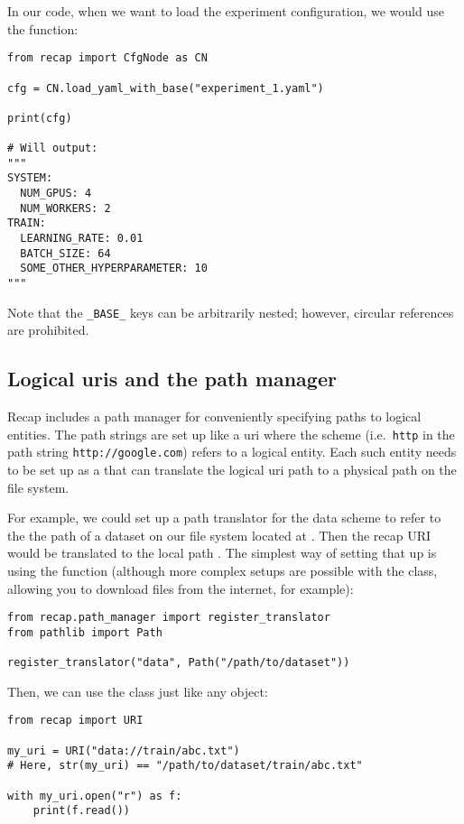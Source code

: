 \documentclass[../../report.tex]{subfiles}
\begin{document}
In our code, when we want to load the experiment configuration, we would use the  function:

\begin{verbatim}
from recap import CfgNode as CN

cfg = CN.load_yaml_with_base("experiment_1.yaml")

print(cfg)

# Will output:
"""
SYSTEM:
  NUM_GPUS: 4
  NUM_WORKERS: 2
TRAIN:
  LEARNING_RATE: 0.01
  BATCH_SIZE: 64
  SOME_OTHER_HYPERPARAMETER: 10
"""
\end{verbatim}
Note that the \texttt{_BASE_} keys can be arbitrarily nested;
however, circular references are prohibited.

\subsection{Logical \acsp{uri} and the path manager}
\label{sec:recap_uris}
Recap includes a path manager for conveniently specifying paths to logical entities.
The path strings are set up like a \gls{uri} where the scheme (i.e.\ \texttt{http} in the path string \texttt{http://google.com}) refers to a logical entity.
Each such entity needs to be set up as a  that can translate the logical \gls{uri} path to a physical path on the file system.

For example, we could set up a path translator for the data scheme to refer to the the path of a dataset on our file system located at . Then the recap URI  would be translated to the local path .
The simplest way of setting that up is using the  function (although more complex setups are possible with the  class, allowing you to download files from the internet, for example):

\begin{verbatim}
from recap.path_manager import register_translator
from pathlib import Path

register_translator("data", Path("/path/to/dataset"))
\end{verbatim}
Then, we can use the  class just like any  object:
\begin{verbatim}
from recap import URI

my_uri = URI("data://train/abc.txt")
# Here, str(my_uri) == "/path/to/dataset/train/abc.txt"

with my_uri.open("r") as f:
    print(f.read())
\end{verbatim}
\end{document}
